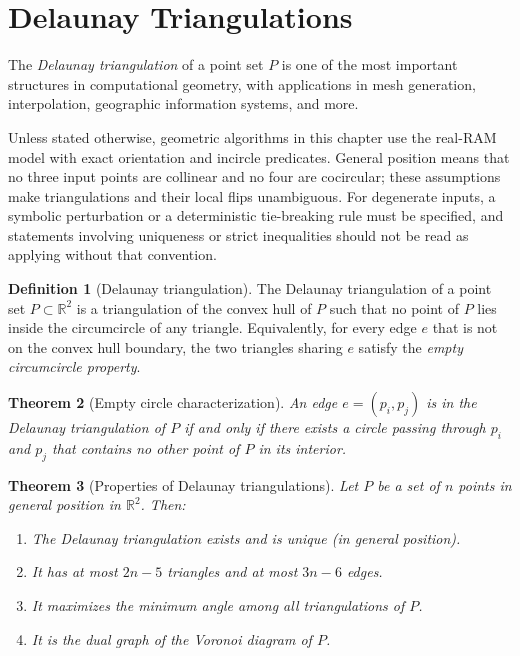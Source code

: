 \documentclass[twoside,12pt]{book}
\theoremstyle{plain}
\newtheorem{theorem}{Theorem}[chapter]
\theoremstyle{definition}
\newtheorem{definition}[theorem]{Definition}
\theoremstyle{remark}
\begin{document}
\section{Delaunay Triangulations}
\label{sec:delaunay}

The \emph{Delaunay triangulation} of a point set $P$ is one of the most important structures in computational geometry, with applications in mesh generation, interpolation, geographic information systems, and more.

Unless stated otherwise, geometric algorithms in this chapter use the real-RAM
model with exact orientation and incircle predicates. General position means
that no three input points are collinear and no four are cocircular; these
assumptions make triangulations and their local flips unambiguous. For
degenerate inputs, a symbolic perturbation or a deterministic tie-breaking
rule must be specified, and statements involving uniqueness or strict
inequalities should not be read as applying without that convention.

\begin{definition}[Delaunay triangulation]
The Delaunay triangulation of a point set $P \subset \mathbb{R}^2$ is a triangulation of the convex hull of $P$ such that no point of $P$ lies inside the circumcircle of any triangle. Equivalently, for every edge $e$ that is not on the convex hull boundary, the two triangles sharing $e$ satisfy the \emph{empty circumcircle property}.
\end{definition}

\begin{theorem}[Empty circle characterization]
An edge $e = (p_i, p_j)$ is in the Delaunay triangulation of $P$ if and only if there exists a circle passing through $p_i$ and $p_j$ that contains no other point of $P$ in its interior.
\end{theorem}

\begin{theorem}[Properties of Delaunay triangulations]
\label{thm:delaunay-props}
Let $P$ be a set of $n$ points in general position in $\mathbb{R}^2$. Then:
\begin{enumerate}[nosep]
    \item The Delaunay triangulation exists and is unique (in general position).
    \item It has at most $2n - 5$ triangles and at most $3n - 6$ edges.
    \item It maximizes the minimum angle among all triangulations of $P$.
    \item It is the dual graph of the Voronoi diagram of $P$.
\end{enumerate}
\end{theorem}
\end{document}
